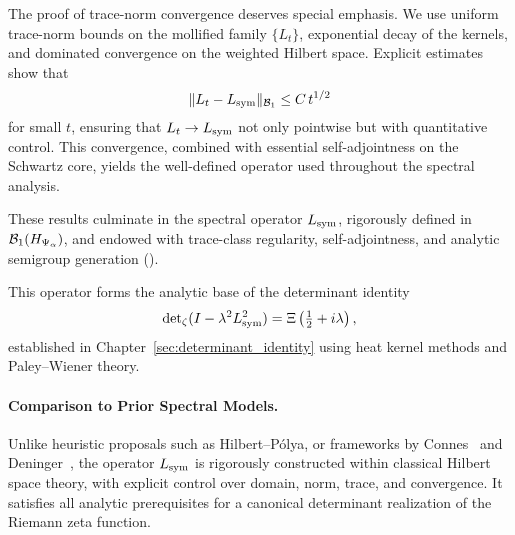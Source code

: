 The proof of trace-norm convergence deserves special emphasis.  We use uniform trace-norm bounds on the mollified family \(\{L_t\}\), exponential decay of the kernels, and dominated convergence on the weighted Hilbert space.  Explicit estimates show that
\[
  \|L_t-L_{\mathrm{sym}}\|_{\mathcal{B}_1} \le C\,t^{1/2}
\]
for small \(t\), ensuring that \(L_t\to L_{\mathrm{sym}}\) not only pointwise but with quantitative control.  This convergence, combined with essential self-adjointness on the Schwartz core, yields the well-defined operator used throughout the spectral analysis.

These results culminate in the spectral operator \( L_{\mathrm{sym}} \), rigorously defined in \( \mathcal{B}_1(H_{\Psi_\alpha}) \), and endowed with trace-class regularity, self-adjointness, and analytic semigroup generation ().

\medskip

This operator forms the analytic base of the determinant identity
\[
\det\nolimits_{\zeta}(I - \lambda^2 L_{\mathrm{sym}}^2) = \Xi\left(\tfrac{1}{2} + i\lambda\right),
\]
established in Chapter~\ref{sec:determinant_identity} using heat kernel methods and Paley--Wiener theory.

\paragraph{Comparison to Prior Spectral Models.}
Unlike heuristic proposals such as Hilbert--Pólya, or frameworks by Connes~\cite{Connes1999TraceFormula} and Deninger~\cite{Deninger1998Frobenius}, the operator \( L_{\mathrm{sym}} \) is rigorously constructed within classical Hilbert space theory, with explicit control over domain, norm, trace, and convergence. It satisfies all analytic prerequisites for a canonical determinant realization of the Riemann zeta function.
